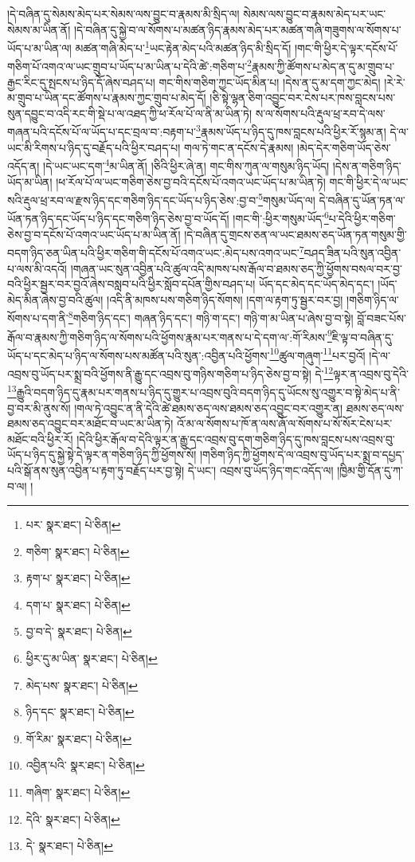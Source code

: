 །དེ་བཞིན་དུ་སེམས་མེད་པར་སེམས་ལས་བྱུང་བ་རྣམས་མི་སྲིད་ལ། སེམས་ལས་བྱུང་བ་རྣམས་མེད་པར་ཡང་སེམས་མ་ཡིན་ནོ། །དེ་བཞིན་དུ་སྐྱེ་བ་ལ་སོགས་པ་མཚན་ཉིད་རྣམས་མེད་པར་མཚན་གཞི་གཟུགས་ལ་སོགས་པ་ཡོད་པ་མ་ཡིན་ལ། མཚན་གཞི་མེད་པ་\footnote{པར་  སྣར་ཐང་།  པེ་ཅིན། }ཡང་རྟེན་མེད་པའི་མཚན་ཉིད་མི་སྲིད་དོ། །གང་གི་ཕྱིར་དེ་ལྟར་དངོས་པོ་གཅིག་པོ་འགའ་ལ་ཡང་གྲུབ་པ་ཡོད་པ་མ་ཡིན་པ་དེའི་ཚེ་:གཅིག་པ་\footnote{གཅིག་  སྣར་ཐང་།  པེ་ཅིན། }རྣམས་ཀྱི་ཚོགས་པ་མེད་ན་དུ་མ་གྲུབ་པ་རྒྱང་རིང་དུ་སྤངས་པ་ཉིད་དོ་ཞེས་བཤད་པ། གང་གིས་གཅིག་ཀྱང་ཡོད་མིན་པ། །དེས་ན་དུ་མ་དག་ཀྱང་མེད། །རེ་རེ་མ་གྲུབ་པ་ཡིན་དང་ཚོགས་པ་རྣམས་ཀྱང་གྲུབ་པ་མེད་དོ། །ཅི་སྟེ་ལྷན་ཅིག་འབྱུང་བར་ངེས་པར་ཁས་བླངས་པས་སུན་དབྱུང་བ་འདི་རང་གི་སྡེ་པ་ལ་འཐད་ཀྱི་ཕ་རོལ་པོ་ལ་ནི་མ་ཡིན་ཏེ། ས་ལ་སོགས་པའི་རྡུལ་ཕྲ་རབ་དེ་ལས་གཞན་པའི་དངོས་པོ་ལ་ཡོད་པ་དང་བྲལ་བ་:བརྟག་པ་\footnote{རྟག་པ་  སྣར་ཐང་།  པེ་ཅིན། }རྣམས་ཡོད་པ་ཉིད་དུ་ཁས་བླངས་པའི་ཕྱིར་རོ་སྙམ་ན། དེ་ལ་ཡང་མི་རིགས་པ་ཉིད་དུ་བརྗོད་པའི་ཕྱིར་བཤད་པ། གལ་ཏེ་གང་ན་དངོས་དེ་རྣམས། །མེད་དེར་གཅིག་ཡོད་ཅེས་འདོད་ན། །དེ་ཡང་ཡང་དག་\footnote{དག་པ་  སྣར་ཐང་།  པེ་ཅིན། }མ་ཡིན་ནོ། །ཅིའི་ཕྱིར་ཞེ་ན། གང་གིས་ཀུན་ལ་གསུམ་ཉིད་ཡོད། །དེས་ན་གཅིག་ཉིད་ཡོད་མ་ཡིན། །ཕ་རོལ་པོ་ལ་ཡང་གཅིག་ཅེས་བྱ་བའི་དངོས་པོ་འགའ་ཡང་ཡོད་པ་མ་ཡིན་ཏེ། གང་གི་ཕྱིར་དེ་ལ་ཡང་སའི་རྡུལ་ཕྲ་རབ་ལ་རྫས་ཉིད་དང་གཅིག་ཉིད་དང་ཡོད་པ་ཉིད་ཅེས་:བྱ་བ་\footnote{བྱ་བ་དེ་  སྣར་ཐང་།  པེ་ཅིན། }གསུམ་ཡོད་ལ། དེ་བཞིན་དུ་ཡོན་ཏན་ལ་ཡོན་ཏན་ཉིད་དང་ཡོད་པ་ཉིད་དང་གཅིག་ཉིད་ཅེས་བྱ་བ་ཡོད་དོ། །གང་གི་:ཕྱིར་གསུམ་ཡོད་\footnote{ཕྱིར་དུ་མ་ཡིན་  སྣར་ཐང་།  པེ་ཅིན། }པ་དེའི་ཕྱིར་གཅིག་ཅེས་བྱ་བ་དངོས་པོ་འགའ་ཡང་ཡོད་པ་མ་ཡིན་ནོ། །དེ་བཞིན་དུ་གྲངས་ཅན་ལ་ཡང་ཐམས་ཅད་ཡོན་ཏན་གསུམ་གྱི་བདག་ཉིད་ཅན་ཡིན་པའི་ཕྱིར་གཅིག་གི་དངོས་པོ་འགའ་ཡང་:མེད་པས་འགའ་ཡང་\footnote{མེད་པས་  སྣར་ཐང་།  པེ་ཅིན། }བཤད་ཟིན་པའི་སུན་འབྱིན་པ་ལས་མི་འདའོ། །གཞན་ཡང་སུན་འབྱིན་པའི་ཚུལ་འདི་མཁས་པས་རྒོལ་བ་ཐམས་ཅད་ཀྱི་ཕྱོགས་བསལ་བར་བྱ་བའི་ཕྱིར་སྦྱར་བར་བྱའོ་ཞེས་བསླབ་པའི་ཕྱིར་སློབ་དཔོན་གྱིས་བཤད་པ། ཡོད་དང་མེད་དང་ཡོད་མེད་དང་། །ཡོད་མེད་མིན་ཞེས་བྱ་བའི་ཚུལ། །འདི་ནི་མཁས་པས་གཅིག་ཉིད་སོགས། །དག་ལ་རྟག་ཏུ་སྦྱར་བར་བྱ། །གཅིག་ཉིད་ལ་སོགས་པ་དག་ནི་\footnote{ཉིད་དང་  སྣར་ཐང་།  པེ་ཅིན། }གཅིག་ཉིད་དང་། གཞན་ཉིད་དང་། གཉི་ག་དང་། གཉི་ག་མ་ཡིན་པ་ཞེས་བྱ་བ་སྟེ། བློ་བཟང་པོས་རྒོལ་བ་རྣམས་ཀྱི་གཅིག་ཉིད་ལ་སོགས་པའི་ཕྱོགས་རྣམ་པར་གནས་པ་དེ་དག་ལ་:གོ་རིམས་\footnote{གོ་རིམ་  སྣར་ཐང་།  པེ་ཅིན། }ཇི་ལྟ་བ་བཞིན་དུ་ཡོད་པ་དང་མེད་པ་ཉིད་ལ་སོགས་པས་མཚོན་པའི་སུན་:འབྱིན་པའི་ཕྱོགས་\footnote{འབྱིན་པའི་  སྣར་ཐང་།  པེ་ཅིན། }ཚུལ་གཞུག་\footnote{གཞིག་  སྣར་ཐང་།  པེ་ཅིན། }པར་བྱའོ། །དེ་ལ་འབྲས་བུ་ཡོད་པར་སྨྲ་བའི་ཕྱོགས་ནི་རྒྱུ་དང་འབྲས་བུ་གཉིས་གཅིག་པ་ཉིད་ཅེས་བྱ་བ་སྟེ། དེ་\footnote{དེའི་  སྣར་ཐང་།  པེ་ཅིན། }ལྟར་ན་འབྲས་བུ་དེའི་\footnote{དེ་  སྣར་ཐང་།  པེ་ཅིན། }རྒྱུའི་བདག་ཉིད་དུ་རྣམ་པར་གནས་པ་ཉིད་དུ་གྱུར་པ་འབྲས་བུའི་བདག་ཉིད་དུ་ཡོངས་སུ་འགྱུར་བ་སྟེ་མེད་པ་ནི་བྱ་བར་མི་ནུས་སོ། །གལ་ཏེ་འབྱུང་ན་ནི་དེའི་ཚེ་ཐམས་ཅད་ལས་ཐམས་ཅད་འབྱུང་བར་འགྱུར་ན། ཐམས་ཅད་ལས་ཐམས་ཅད་འབྱུང་བར་མཐོང་བ་ཡང་མ་ཡིན་ཏེ། འོ་མ་ལ་སོགས་པ་ཁོ་ན་ལས་ཞོ་ལ་སོགས་པ་སོ་སོར་ངེས་པར་མཐོང་བའི་ཕྱིར་རོ། །དེའི་ཕྱིར་རྒོལ་བ་དེའི་ལྟར་ན་རྒྱུ་དང་འབྲས་བུ་དག་གཅིག་ཉིད་དུ་ཁས་བླངས་པས་འབྲས་བུ་ཡོད་པ་ཉིད་དུ་སྐྱེ་སྟེ་དེ་ལྟར་ན་གཅིག་ཉིད་ཀྱི་ཕྱོགས་སོ། །གཅིག་ཉིད་ཀྱི་ཕྱོགས་དེ་ལ་འབྲས་བུ་ཡོད་པར་སྨྲ་བ་དཔྱད་པའི་སྒོ་ནས་སུན་འབྱིན་པ་རྟག་ཏུ་བརྗོད་པར་བྱ་སྟེ། དེ་ཡང་། འབྲས་བུ་ཡོད་ཉིད་གང་འདོད་ལ། །ཁྱིམ་གྱི་དོན་དུ་ཀ་བ་ལ། །

